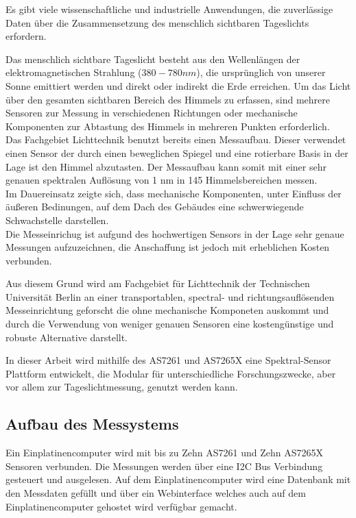 Es gibt viele wissenschaftliche und industrielle Anwendungen, die zuverlässige Daten über die Zusammensetzung des menschlich sichtbaren Tageslichts erfordern.

\noindent Das menschlich sichtbare Tageslicht besteht aus den Wellenlängen der elektromagnetischen Strahlung ($380 - 780 nm$), die ursprünglich von unserer Sonne emittiert werden und direkt oder indirekt die Erde erreichen.
Um das Licht über den gesamten sichtbaren Bereich des Himmels zu erfassen, sind mehrere Sensoren zur Messung in verschiedenen Richtungen oder mechanische Komponenten zur Abtastung des Himmels in mehreren Punkten erforderlich.\\
Das Fachgebiet Lichttechnik benutzt bereits einen Messaufbau. Dieser verwendet einen Sensor der durch einen beweglichen Spiegel und eine rotierbare Basis in der Lage ist den Himmel abzutasten. 
Der Messaufbau kann somit mit einer sehr genauen spektralen Auflösung von 1 nm in 145 Himmelsbereichen messen.\\
Im Dauereinsatz zeigte sich, dass mechanische Komponenten, unter Einfluss der äußeren Bedinungen, auf dem Dach des Gebäudes eine schwerwiegende Schwachstelle darstellen.\\
 Die Messeinrichug ist aufgund des hochwertigen Sensors in der Lage sehr genaue Messungen aufzuzeichnen, die Anschaffung ist jedoch mit erheblichen Kosten verbunden.

\noindent Aus diesem Grund wird am Fachgebiet für Lichttechnik der Technischen Universität Berlin an einer transportablen, spectral- und richtungsauflösenden Messeinrichtung geforscht die ohne mechanische Komponeten auskommt und durch die Verwendung von weniger genauen Sensoren eine kostengünstige und robuste Alternative darstellt.

\noindent In dieser Arbeit wird mithilfe des AS7261 und AS7265X eine Spektral-Sensor Plattform entwickelt, die Modular für unterschiedliche Forschungszwecke, aber vor allem zur Tageslichtmessung, genutzt werden kann.


\subsection{Aufbau des Messystems}
Ein Einplatinencomputer wird mit bis zu Zehn AS7261 und Zehn AS7265X Sensoren verbunden.
Die Messungen werden über eine I2C Bus Verbindung gesteuert und ausgelesen.
Auf dem Einplatinencomputer  wird eine Datenbank mit den Messdaten gefüllt und über ein Webinterface welches auch auf dem Einplatinencomputer gehostet wird verfügbar gemacht.
